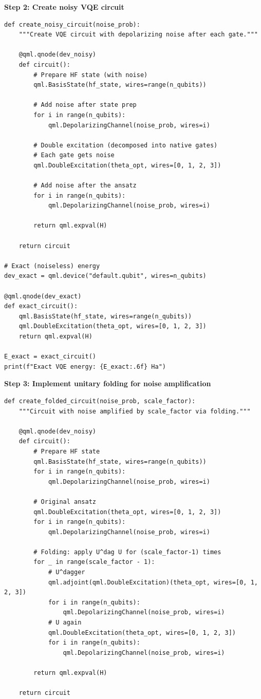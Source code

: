 \documentclass[11pt,a4paper]{article}
\begin{document}
\textbf{Step 2: Create noisy VQE circuit}
\begin{lstlisting}
def create_noisy_circuit(noise_prob):
    """Create VQE circuit with depolarizing noise after each gate."""
    
    @qml.qnode(dev_noisy)
    def circuit():
        # Prepare HF state (with noise)
        qml.BasisState(hf_state, wires=range(n_qubits))
        
        # Add noise after state prep
        for i in range(n_qubits):
            qml.DepolarizingChannel(noise_prob, wires=i)
        
        # Double excitation (decomposed into native gates)
        # Each gate gets noise
        qml.DoubleExcitation(theta_opt, wires=[0, 1, 2, 3])
        
        # Add noise after the ansatz
        for i in range(n_qubits):
            qml.DepolarizingChannel(noise_prob, wires=i)
        
        return qml.expval(H)
    
    return circuit

# Exact (noiseless) energy
dev_exact = qml.device("default.qubit", wires=n_qubits)

@qml.qnode(dev_exact)
def exact_circuit():
    qml.BasisState(hf_state, wires=range(n_qubits))
    qml.DoubleExcitation(theta_opt, wires=[0, 1, 2, 3])
    return qml.expval(H)

E_exact = exact_circuit()
print(f"Exact VQE energy: {E_exact:.6f} Ha")
\end{lstlisting}

\textbf{Step 3: Implement unitary folding for noise amplification}
\begin{lstlisting}
def create_folded_circuit(noise_prob, scale_factor):
    """Circuit with noise amplified by scale_factor via folding."""
    
    @qml.qnode(dev_noisy)
    def circuit():
        # Prepare HF state
        qml.BasisState(hf_state, wires=range(n_qubits))
        for i in range(n_qubits):
            qml.DepolarizingChannel(noise_prob, wires=i)
        
        # Original ansatz
        qml.DoubleExcitation(theta_opt, wires=[0, 1, 2, 3])
        for i in range(n_qubits):
            qml.DepolarizingChannel(noise_prob, wires=i)
        
        # Folding: apply U^dag U for (scale_factor-1) times
        for _ in range(scale_factor - 1):
            # U^dagger
            qml.adjoint(qml.DoubleExcitation)(theta_opt, wires=[0, 1, 2, 3])
            for i in range(n_qubits):
                qml.DepolarizingChannel(noise_prob, wires=i)
            # U again
            qml.DoubleExcitation(theta_opt, wires=[0, 1, 2, 3])
            for i in range(n_qubits):
                qml.DepolarizingChannel(noise_prob, wires=i)
        
        return qml.expval(H)
    
    return circuit
\end{lstlisting}
\end{document}
